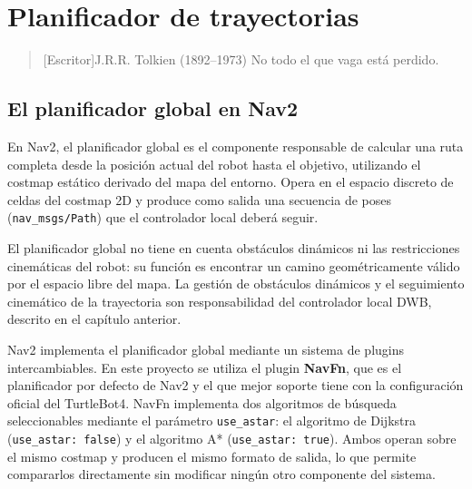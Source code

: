 \chapter{Planificador de trayectorias}

\begin{quotation}[Escritor]{J.R.R. Tolkien (1892--1973)}
No todo el que vaga está perdido.
\end{quotation}

\begin{abstract}
Este capítulo describe el funcionamiento del planificador global de trayectorias utilizado en el proyecto. Se analiza el plugin NavFn de Nav2, los algoritmos de Dijkstra y A* que implementa, el papel del suavizado de trayectorias, y se discute el algoritmo RRT como posible alternativa.
\end{abstract}

\section{El planificador global en Nav2}

En Nav2, el planificador global es el componente responsable de calcular una ruta completa desde la posición actual del robot hasta el objetivo, utilizando el costmap estático derivado del mapa del entorno. Opera en el espacio discreto de celdas del costmap 2D y produce como salida una secuencia de poses (\texttt{nav\_msgs/Path}) que el controlador local deberá seguir.

El planificador global no tiene en cuenta obstáculos dinámicos ni las restricciones cinemáticas del robot: su función es encontrar un camino geométricamente válido por el espacio libre del mapa. La gestión de obstáculos dinámicos y el seguimiento cinemático de la trayectoria son responsabilidad del controlador local DWB, descrito en el capítulo anterior.

Nav2 implementa el planificador global mediante un sistema de plugins intercambiables. En este proyecto se utiliza el plugin \textbf{NavFn}, que es el planificador por defecto de Nav2 y el que mejor soporte tiene con la configuración oficial del TurtleBot4. NavFn implementa dos algoritmos de búsqueda seleccionables mediante el parámetro \texttt{use\_astar}: el algoritmo de Dijkstra (\texttt{use\_astar: false}) y el algoritmo A* (\texttt{use\_astar: true}). Ambos operan sobre el mismo costmap y producen el mismo formato de salida, lo que permite compararlos directamente sin modificar ningún otro componente del sistema.

